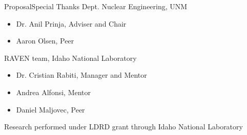 \documentclass{beamer}
\begin{document}
\begin{frame}{Proposal}{Special Thanks}\vspace{-20pt}
  \pause
  Dept. Nuclear Engineering, UNM
  \begin{itemize}
    \item Dr. Anil Prinja, Adviser and Chair
    \item Aaron Olsen, Peer
  \end{itemize}
  RAVEN team, Idaho National Laboratory
  \begin{itemize}
    \item Dr. Cristian Rabiti, Manager and Mentor
    \item Andrea Alfonsi, Mentor
    \item Daniel Maljovec, Peer
  \end{itemize}
  \vspace{10pt}
  \centering
  Research performed under LDRD grant through Idaho National Laboratory
\end{frame}
\end{document}
